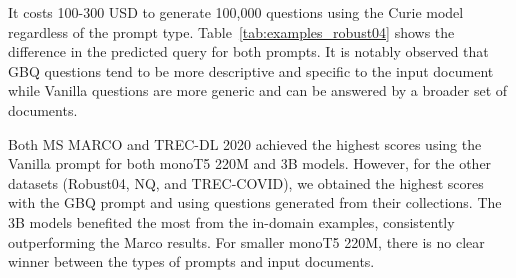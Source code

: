 \documentclass[11pt]{article}
\begin{document}
It costs 100-300 USD to generate 100,000 questions using the Curie model regardless of the prompt type. Table~\ref{tab:examples_robust04} shows the difference in the predicted query for both prompts. It is notably observed that GBQ questions tend to be more descriptive and specific to the input document while Vanilla questions are more generic and can be answered by a broader set of documents.

Both MS MARCO and TREC-DL 2020 achieved the highest scores using the Vanilla prompt for both monoT5 220M and 3B models. However, for the other datasets (Robust04, NQ, and TREC-COVID), we obtained the highest scores with the GBQ prompt and using questions generated from their collections. The 3B models benefited the most from the in-domain examples, consistently outperforming the Marco results. For smaller monoT5 220M, there is no clear winner between the types of prompts and input documents.



\end{document}
